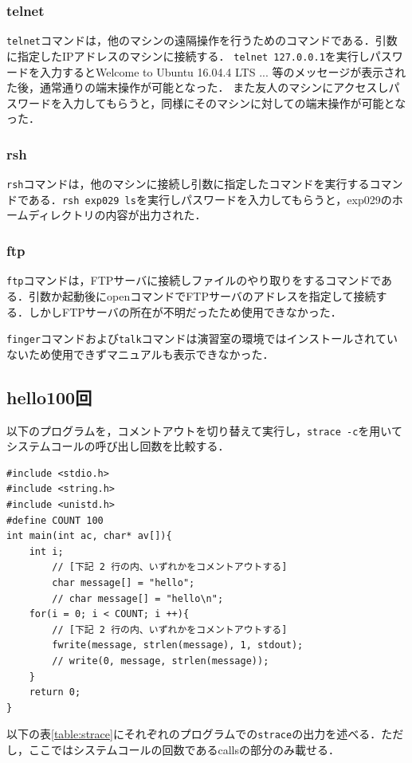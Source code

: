 \documentclass[a4j,10pt,titlepage]{jsarticle}
\begin{document}
\subsubsection{telnet}
\verb|telnet|コマンドは，他のマシンの遠隔操作を行うためのコマンドである．引数に指定したIPアドレスのマシンに接続する．
\verb|telnet 127.0.0.1|を実行しパスワードを入力するとWelcome to Ubuntu 16.04.4 LTS ... 等のメッセージが表示された後，通常通りの端末操作が可能となった．
また友人のマシンにアクセスしパスワードを入力してもらうと，同様にそのマシンに対しての端末操作が可能となった．

\subsubsection{rsh}
\verb|rsh|コマンドは，他のマシンに接続し引数に指定したコマンドを実行するコマンドである．\verb|rsh exp029 ls|を実行しパスワードを入力してもらうと，exp029のホームディレクトリの内容が出力された．

\subsubsection{ftp}
\verb|ftp|コマンドは，FTPサーバに接続しファイルのやり取りをするコマンドである．引数か起動後にopenコマンドでFTPサーバのアドレスを指定して接続する．しかしFTPサーバの所在が不明だったため使用できなかった．

\verb|finger|コマンドおよび\verb|talk|コマンドは演習室の環境ではインストールされていないため使用できずマニュアルも表示できなかった．

\subsection{hello100回}
以下のプログラムを，コメントアウトを切り替えて実行し，\verb|strace -c|を用いてシステムコールの呼び出し回数を比較する．
\begin{verbatim}
#include <stdio.h>
#include <string.h>
#include <unistd.h>
#define COUNT 100
int main(int ac, char* av[]){
    int i;
        // [下記 2 行の内、いずれかをコメントアウトする]
        char message[] = "hello";
        // char message[] = "hello\n";
    for(i = 0; i < COUNT; i ++){
        // [下記 2 行の内、いずれかをコメントアウトする]
        fwrite(message, strlen(message), 1, stdout);
        // write(0, message, strlen(message));
    }
    return 0;
}
\end{verbatim}

以下の表\ref{table:strace}にそれぞれのプログラムでの\verb|strace|の出力を述べる．ただし，ここではシステムコールの回数であるcallsの部分のみ載せる．
\end{document}
